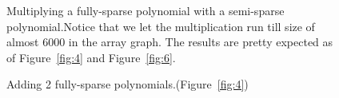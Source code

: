 \documentclass[journal,article,submit,moreauthors,algorithms]{Definitions/mdpi}
\begin{document}
\begin{figure}[H] 
\centering
{}
\hfil
{}
\caption{Multiplying a fully-sparse polynomial with a semi-sparse polynomial.Notice that we let the multiplication run till size of almost 6000 in the array graph. The results are pretty expected as of Figure~\ref{fig:4} and Figure~\ref{fig:6}.}
\label{fig:12}
\end{figure}



\begin{figure}[H] 
\centering
{}
\hfil
{}
\caption{Adding 2 fully-sparse polynomials.(Figure~\ref{fig:4})}
\label{fig:13}
\end{figure}
\end{document}
